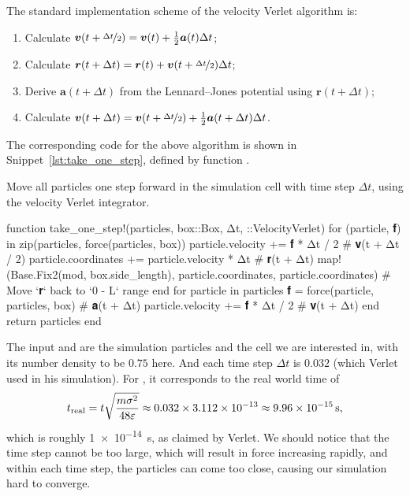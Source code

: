 The standard implementation scheme of the velocity Verlet algorithm is:
%
\begin{enumerate}
    \item Calculate $\bm{v}(t + \nicefrac{\Delta t}{2}) = \bm{v}(t) + \frac{1}{2} \bm{a}(t) \Delta t$;
    \item Calculate $\bm{r}(t + \Delta t) = \bm{r}(t) + \bm{v}(t + \nicefrac{\Delta t}{2}) \Delta t$;
    \item Derive $\bm{a}(t + \Delta t)$ from the Lennard--Jones potential using $\bm{r}(t + \Delta t)$;
    \item Calculate $\bm{v}(t + \Delta t) = \bm{v}(t + \nicefrac{\Delta t}{2}) + \frac{1}{2} \bm{a}(t + \Delta t) \Delta t$.
\end{enumerate}
%
The corresponding code for the above algorithm is shown in Snippet~\ref{lst:take_one_step},
defined by function .
%
\begin{algorithm}
    \caption{Move all particles one step forward in the simulation cell with time step
        $\Delta t$, using the velocity Verlet integrator.}
    \label{lst:take_one_step}
    \begin{juliacode}
        function take_one_step!(particles, box::Box, Δt, ::VelocityVerlet)
            for (particle, 𝐟) in zip(particles, force(particles, box))
                particle.velocity += 𝐟 * Δt / 2  # 𝐯(t + Δt / 2)
                particle.coordinates += particle.velocity * Δt  # 𝐫(t + Δt)
                map!(Base.Fix2(mod, box.side_length), particle.coordinates, particle.coordinates)  # Move `𝐫` back to `0 - L` range
            end
            for particle in particles
                𝐟 = force(particle, particles, box)  # 𝐚(t + Δt)
                particle.velocity += 𝐟 * Δt / 2  # 𝐯(t + Δt)
            end
            return particles
        end
    \end{juliacode}
\end{algorithm}
%
The input  and  are the simulation particles and the cell we
are interested in, with its number density to be $0.75$ here. And each time step
$\Delta t$ is $0.032$ (which Verlet used in his simulation). For , it corresponds
to the real world time of
%
\begin{equation}
    t_\textnormal{real} = t \sqrt{\frac{ m \sigma^2 }{ 48 \varepsilon }}
    \approx 0.032 \times \num{3.112e-13}
    \approx \qty{9.96e-15}{\second},
\end{equation}
%
which is roughly \qty{1e-14}{\second}, as claimed by Verlet\cite{Verlet}.
We should notice that the time step cannot be too large, which will result in force
increasing rapidly, and within each time step, the particles can come too close,
causing our simulation hard to converge.
